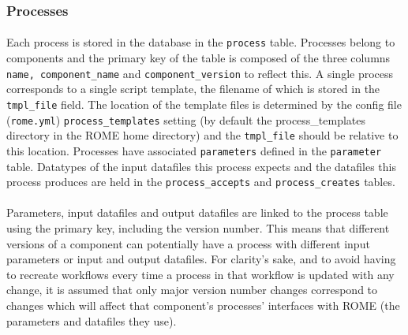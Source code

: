 \subsubsection{Processes}
\label{sec:model_processes}
\paragraph{}
Each process is stored in the database in the \texttt{process} table. Processes belong to components and the primary key of the table is composed of the three columns \texttt{name, component\_name} and \texttt{component\_version} to reflect this. A single process corresponds to a single script template, the filename of which is stored in the \texttt{tmpl\_file} field. The location of the template files is determined by the config file (\texttt{rome.yml}) \texttt{process\_templates} setting (by default the process\_templates directory in the ROME home directory) and the \texttt{tmpl\_file} should be relative to this location. Processes have associated \texttt{parameters} defined in the \texttt{parameter} table. Datatypes of the input datafiles this process expects and the datafiles this process produces are held in the \texttt{process\_accepts} and \texttt{process\_creates} tables. 

\paragraph{}
Parameters, input datafiles and output datafiles are linked to the process table using the primary key, including the version number. This means that different versions of a component can potentially have a process with different input parameters or input and output datafiles. For clarity's sake, and to avoid having to recreate workflows every time a process in that workflow is updated with any change, it is assumed that only major version number changes correspond to changes which will affect that component's processes' interfaces with ROME (the parameters and datafiles they use).


